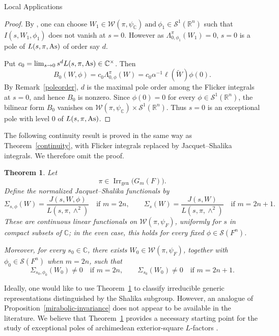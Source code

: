 \documentclass[12pt,reqno]{amsart}
\numberwithin{equation}{section}%
\numberwithin{equation}{subsection}
\newtheorem{thm}[equation]{Theorem}%
\theoremstyle{definition}
\theoremstyle{remark}
\begin{document}
\begin{section}{Local Applications}
\begin{proof}
By \cite[Proposition~3.8]{Yad2024}, one can choose $W_1\in\mathcal{W}(\pi,\psi_{\mathbb{C}})
\>\text{and}\> \phi_1\in\mathcal{S}^{1}(\mathbb{R}^{n})$ such that \(I(s,W_1,\phi_1)\) does not vanish at \(s=0\). However as $\Lambda_{0,\phi_1}^{\pi}(W_1)=0$, \(s=0\) is a pole of
\(L(s,\pi,{\rm As})\) of order say $d$.

Put
\(c_0=\lim_{s\to0}s^dL(s,\pi,{\rm As})\in\mathbb{C}^{\times}\). Then
\[
B_0(W,\phi)
=
c_0\Lambda_{0,\phi}^{\pi}(W)
=
c_0\alpha^{-1}\ell(\widetilde W)\phi(0).
\]
By Remark~\ref{poleorder}, \(d\) is the
maximal pole order among the Flicker integrals at \(s=0\), and hence
\(B_0\) is nonzero. Since \(\phi(0)=0\) for every
\(\phi\in\mathcal{S}^{1}(\mathbb{R}^{n})\), the bilinear form \(B_0\)
vanishes on
\(\mathcal{W}(\pi,\psi_{\mathbb{C}})
\times\mathcal{S}^{1}(\mathbb{R}^{n})\). Thus \(s=0\) is an
exceptional pole with level \(0\) of \(L(s,\pi,{\rm As})\).
\end{proof}

The following continuity result is proved in the same way as
Theorem~\ref{continuity}, with Flicker integrals replaced by
Jacquet--Shalika integrals. We therefore omit the proof.

\begin{thm}\label{continuity-exterior-square}
Let
\[
\pi\in\operatorname{Irr}_{\mathrm{gen}}\bigl(G_m(F)\bigr).
\]
Define the normalized Jacquet--Shalika functionals by
\[
\Sigma_{s,\phi}(W)
=
\frac{J(s,W,\phi)}{L(s,\pi,\wedge^2)}
\quad\text{if }m=2n,
\qquad
\Sigma_s(W)
=
\frac{J(s,W)}{L(s,\pi,\wedge^2)}
\quad\text{if }m=2n+1.
\]
These are continuous linear functionals on
\(\mathcal{W}(\pi,\psi_F)\), uniformly for \(s\) in compact subsets of
\(\mathbb{C}\); in the even case, this holds for every fixed
\(\phi\in\mathcal{S}(F^n)\).

Moreover, for every \(s_0\in\mathbb{C}\), there exists
\(W_0\in\mathcal{W}(\pi,\psi_F)\), together with
\(\phi_0\in\mathcal{S}(F^n)\) when \(m=2n\), such that
\[
\Sigma_{s_0,\phi_0}(W_0)\neq 0
\quad\text{if }m=2n,
\qquad
\Sigma_{s_0}(W_0)\neq 0
\quad\text{if }m=2n+1.
\]
\end{thm}

Ideally, one would like to use Theorem~\ref{continuity-exterior-square} to classify irreducible generic representations distinguished by the Shalika subgroup. However, an analogue of Proposition~\ref{mirabolic-invariance} does not appear to be available in the literature. We believe that Theorem~\ref{continuity-exterior-square} provides a
necessary starting point for the study of exceptional poles of
archimedean exterior-square \(L\)-factors \cite{CPS1994}.
\end{section}
\end{document}
